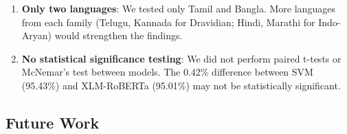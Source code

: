 \documentclass[conference]{IEEEtran}
\begin{document}
\begin{enumerate}
\item \textbf{Only two languages}: We tested only Tamil and Bangla. More languages from each family (Telugu, Kannada for Dravidian; Hindi, Marathi for Indo-Aryan) would strengthen the findings.

\item \textbf{No statistical significance testing}: We did not perform paired t-tests or McNemar's test between models. The 0.42\% difference between SVM (95.43\%) and XLM-RoBERTa (95.01\%) may not be statistically significant.
\end{enumerate}

\subsection{Future Work}
\end{document}

